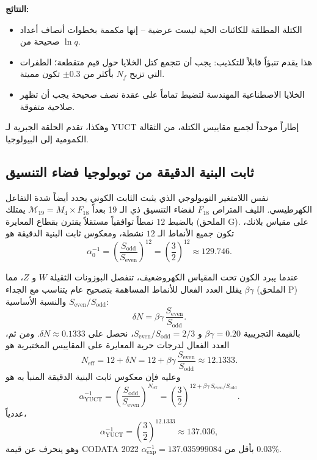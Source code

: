 \documentclass[12pt,a4paper]{article}
\begin{document}
	\textbf{النتائج:}
	\begin{itemize}
		\item الكتلة المطلقة للكائنات الحية ليست عرضية – إنها مكممة بخطوات أنصاف أعداد صحيحة من \(\ln q\).
		\item هذا يقدم تنبؤاً قابلاً للتكذيب: يجب أن تتجمع كتل الخلايا حول قيم متقطعة؛ الطفرات التي تزيح \(N_f\) بأكثر من \(\pm0.3\) تكون مميتة.
		\item الخلايا الاصطناعية المهندسة لتضبط تماماً على عقدة نصف صحيحة يجب أن تظهر صلاحية متفوقة.
	\end{itemize}
	
	وهكذا، تقدم الحلقة الجبرية لـ YUCT إطاراً موحداً لجميع مقاييس الكتلة، من الثقالة الكمومية إلى البيولوجيا.
	
	\subsection{ثابت البنية الدقيقة من توبولوجيا فضاء التنسيق}
	\label{subsec:alpha-topology}
	
	نفس اللامتغير التوبولوجي الذي يثبت الثابت الكوني يحدد أيضاً شدة التفاعل الكهرطيسي. الليف المتراص \(F_{18}\) لفضاء التنسيق ذي الـ 19 بعداً \(\mathcal{M}_{19}=M_4\times F_{18}\) يمتلك بالضبط \(12\) نمطاً توافقياً مستقلاً يقترن بقطاع المعايرة (الملحق G). على مقياس بلانك، تكون جميع الأنماط الـ \(12\) نشطة، ومعكوس ثابت البنية الدقيقة هو
	\begin{equation}
		\alpha_0^{-1} = \left(\frac{S_{\mathrm{odd}}}{S_{\mathrm{even}}}\right)^{12}
		= \left(\frac{3}{2}\right)^{12} \approx 129.746 .
	\end{equation}
	
	عندما يبرد الكون تحت المقياس الكهروضعيف، تنفصل البوزونات الثقيلة \(W\) و \(Z\)، مما يقلل العدد الفعال للأنماط المساهمة بتصحيح عام يتناسب مع الجداء \(\beta\gamma\) (الملحق P) والنسبة الأساسية \(S_{\mathrm{even}}/S_{\mathrm{odd}}\):
	\begin{equation}
		\delta N = \beta\gamma \, \frac{S_{\mathrm{even}}}{S_{\mathrm{odd}}} .
	\end{equation}
	بالقيمة التجريبية \(\beta\gamma = 0.20\) و \(S_{\mathrm{even}}/S_{\mathrm{odd}} = 2/3\)، نحصل على \(\delta N \approx 0.1333\). ومن ثم، العدد الفعال لدرجات حرية المعايرة على المقاييس المختبرية هو
	\begin{equation}
		N_{\mathrm{eff}} = 12 + \delta N = 12 + \beta\gamma\,\frac{S_{\mathrm{even}}}{S_{\mathrm{odd}}}
		\approx 12.1333 .
	\end{equation}
	وعليه فإن معكوس ثابت البنية الدقيقة المنبأ به هو
	\begin{equation}
		\boxed{\alpha^{-1}_{\mathrm{YUCT}} =
			\left(\frac{S_{\mathrm{odd}}}{S_{\mathrm{even}}}\right)^{N_{\mathrm{eff}}}
			= \left(\frac{3}{2}\right)^{12 + \beta\gamma\,S_{\mathrm{even}}/S_{\mathrm{odd}}} } .
		\label{eq:alpha-yuct}
	\end{equation}
	عددياً،
	\[
	\alpha^{-1}_{\mathrm{YUCT}} = \left(\frac{3}{2}\right)^{12.1333} \approx 137.036 ,
	\]
	وهو ينحرف عن قيمة CODATA 2022 \(\alpha^{-1}_{\mathrm{exp}} = 137.035999084\) بأقل من \(0.03\%\).
	
\end{document}
